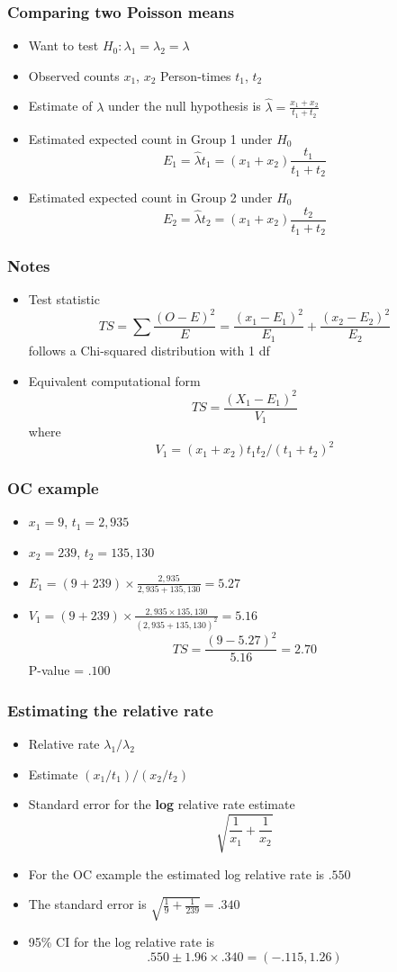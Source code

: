 \documentclass[aspectratio=169]{beamer}
\begin{document}
\begin{frame}\frametitle{Comparing two Poisson means}
\begin{itemize}
\item Want to test $H_0 : \lambda_1 = \lambda_2 = \lambda$ 
\item Observed counts $x_1$, $x_2$ Person-times $t_1$, $t_2$
\item Estimate of $\lambda$ under the null hypothesis is 
  $\hat \lambda = \frac{x_1 + x_2}{t_1 + t_2}$
\item Estimated expected count in Group 1 under $H_0$
  $$
  E_1 = \hat \lambda t_1 = (x_1 + x_2) \frac{t_1}{t_1 + t_2} 
  $$
\item Estimated expected count in Group 2 under $H_0$
  $$
  E_2 = \hat \lambda t_2 = (x_1 + x_2) \frac{t_2}{t_1 + t_2} 
  $$
\end{itemize}
\end{frame}

\begin{frame}\frametitle{Notes}
\begin{itemize}
\item Test statistic
  $$
  TS = \sum \frac{(O - E)^2}{E} =  \frac{(x_1 - E_1)^2}{E_1} + \frac{(x_2 - E_2)^2}{E_2}
  $$
follows a Chi-squared distribution with 1 df
\item Equivalent computational form
  $$
  TS = \frac{(X_1 - E_1)^2}{V_1}
  $$
  where 
  $$
  V_1 = (x_1 + x_2)t_1 t_2 / (t_1 + t_2)^2
  $$
\end{itemize}
\end{frame}

\begin{frame}\frametitle{OC example}
\begin{itemize}
\item $x_1 = 9$, $t_1 = 2,935$
\item $x_2 = 239$, $t_2 = 135,130$
\item $E_1 = (9 + 239) \times \frac{2,935}{2,935 + 135,130} = 5.27$
\item $V_1 = (9 + 239) \times \frac{2,935 \times 135,130}{(2,935 + 135,130)^2} = 5.16$
$$
TS = \frac{(9 - 5.27)^2}{5.16} = 2.70
$$
P-value = $.100$
\end{itemize}
\end{frame}

\begin{frame}\frametitle{Estimating the relative rate}
\begin{itemize}
\item Relative rate $\lambda_1 / \lambda_2$
\item Estimate $(x_1 / t_1) / (x_2 / t_2)$
\item Standard error for the {\bf log} relative rate estimate
  $$
\sqrt{  \frac{1}{x_1} + \frac{1}{x_2}}
  $$
\item For the OC example the estimated log relative rate
  is $.550$
\item The standard error is $\sqrt{\frac{1}{9} + \frac{1}{239}} = .340$
\item 95\% CI for the log relative rate is
  $$
  .550 \pm 1.96 \times .340 = (-.115, 1.26)
  $$
\end{itemize}
\end{frame}
\end{document}
